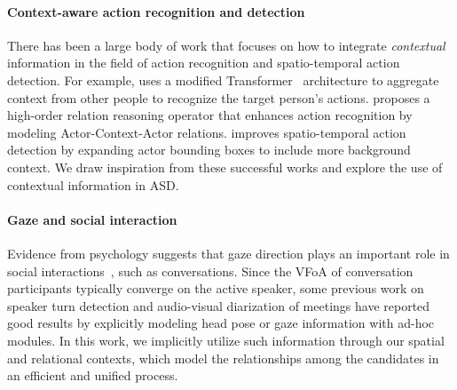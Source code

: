 \documentclass[sigconf]{acmart}
\begin{document}
\begin{CCSXML}
\paragraph{Context-aware action recognition and detection} There has been a large body of work that focuses on how to integrate \textit{contextual} information in the field of action recognition and spatio-temporal action detection. For example, \cite{DBLP:conf/cvpr/GirdharCDZ19} uses a modified Transformer~\cite{DBLP:conf/nips/VaswaniSPUJGKP17} architecture to aggregate context from other people to recognize the target person's actions. \cite{DBLP:journals/corr/abs-2006-07976} proposes a high-order relation reasoning operator that enhances action recognition by modeling Actor-Context-Actor relations. \cite{DBLP:conf/eccv/WuKWZW20} improves spatio-temporal action detection by expanding actor bounding boxes to include more background context. We draw inspiration from these successful works and explore the use of contextual information in ASD.
\vspace{-1ex}
\paragraph{Gaze and social interaction} Evidence from psychology suggests that gaze direction plays an important role in social interactions~\cite{kendon1967some}, such as conversations. Since the VFoA of conversation participants typically converge on the active speaker, some previous work on speaker turn detection \cite{DBLP:conf/interspeech/JokinenHNY10} and audio-visual diarization of meetings \cite{DBLP:conf/mm/GarauBBO09,DBLP:conf/interspeech/GarauDB10,diaz2021audio} have reported good results by explicitly modeling head pose or gaze information with ad-hoc modules. In this work, we implicitly utilize such information through our spatial and relational contexts, which model the relationships among the candidates in an efficient and unified process.
 \vspace{-2ex} 

\end{CCSXML}
\end{document}
